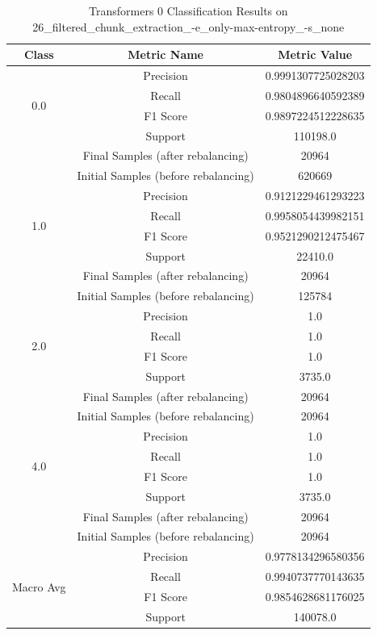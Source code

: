 \begin{longtable}{|c|c|c|}
\caption{Transformers 0 Classification Results on 26\_filtered\_chunk\_extraction\_-e\_only-max-entropy\_-s\_none} \label{tab:26_filtered_chunk_extraction_-e_only-max-entropy_-s_none_transformers_0_classifiers_results} \\
\hline
Class & Metric Name & Metric Value \\
\hline
\multirow{4}{*}{0.0} & Precision & 0.9991307725028203 \\
 & Recall & 0.9804896640592389 \\
 & F1 Score & 0.9897224512228635 \\
 & Support & 110198.0 \\
 & Final Samples (after rebalancing) & 20964 \\
 & Initial Samples (before rebalancing) & 620669 \\
\hline
\multirow{4}{*}{1.0} & Precision & 0.9121229461293223 \\
 & Recall & 0.9958054439982151 \\
 & F1 Score & 0.9521290212475467 \\
 & Support & 22410.0 \\
 & Final Samples (after rebalancing) & 20964 \\
 & Initial Samples (before rebalancing) & 125784 \\
\hline
\multirow{4}{*}{2.0} & Precision & 1.0 \\
 & Recall & 1.0 \\
 & F1 Score & 1.0 \\
 & Support & 3735.0 \\
 & Final Samples (after rebalancing) & 20964 \\
 & Initial Samples (before rebalancing) & 20964 \\
\hline
\multirow{4}{*}{4.0} & Precision & 1.0 \\
 & Recall & 1.0 \\
 & F1 Score & 1.0 \\
 & Support & 3735.0 \\
 & Final Samples (after rebalancing) & 20964 \\
 & Initial Samples (before rebalancing) & 20964 \\
\hline
\multirow{4}{*}{Macro Avg} & Precision & 0.9778134296580356 \\
 & Recall & 0.9940737770143635 \\
 & F1 Score & 0.9854628681176025 \\
 & Support & 140078.0 \\

\end{longtable}
